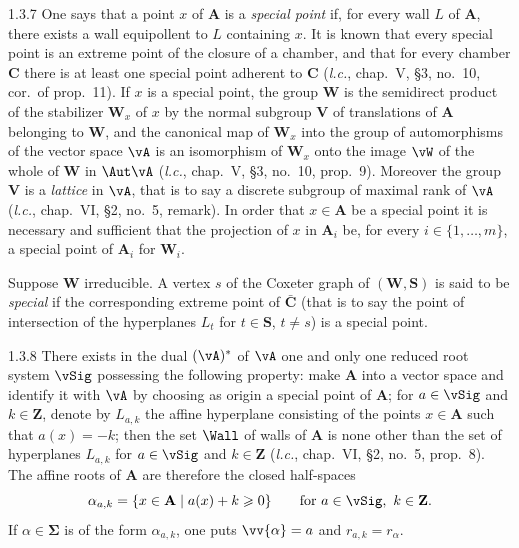 \documentclass[12pt,a4paper,oneside,english]{smfart}
\makeatletter
\newcommand{\btanchor}[1]{\leavevmode\Hy@raisedlink{\hypertarget{bt:#1}{}}}
\theoremstyle{definition}
\theoremstyle{bt}
\makeatother
\begin{document}
\num{1.3.7}\btanchor{1.3.7} One says that a point $x$ of $\mathbf{A}$ is a \emph{special
point} if, for every wall $L$ of $\mathbf{A}$, there exists a wall equipollent to $L$ containing $x$. It is known that every special point is an extreme point of the closure of a chamber, and that for every chamber $\mathbf{C}$ there is at least one special point adherent to $\mathbf{C}$ (\emph{l.c.}, chap.~V, \S3, no.~10, cor.\ of prop.~11). If $x$ is a special point, the group $\mathbf{W}$ is the semidirect product of the stabilizer $\mathbf{W}_x$ of $x$ by the normal subgroup $\mathbf{V}$ of translations of $\mathbf{A}$ belonging to $\mathbf{W}$, and the canonical map of $\mathbf{W}_x$ into the group of automorphisms of the vector space $\vA$ is an isomorphism of $\mathbf{W}_x$ onto the image $\vW$ of the whole of $\mathbf{W}$ in $\Aut\vA$ (\emph{l.c.}, chap.~V, \S3, no.~10, prop.~9). Moreover the group $\mathbf{V}$ is a
\emph{lattice} in $\vA$, that is to say a discrete subgroup of maximal rank of
$\vA$ (\emph{l.c.}, chap.~VI, \S2, no.~5, remark). In order that $x\in\mathbf{A}$ be a special point it is necessary and sufficient that the projection of $x$ in $\mathbf{A}_i$ be, for every $i\in\{1,\dots,m\}$, a special point of $\mathbf{A}_i$ for $\mathbf{W}_i$.

Suppose $\mathbf{W}$ irreducible. A vertex $s$ of the Coxeter graph of $(\mathbf{W},\mathbf{S})$ is said to be \emph{special} if the corresponding extreme point of $\bar{\mathbf{C}}$ (that is to say the point of intersection of the hyperplanes $L_t$ for $t\in\mathbf{S}$, $t\neq s$) is a special point.

\num{1.3.8}\btanchor{1.3.8} There exists in the dual $(\vA)^{*}$ of $\vA$ one and only one
reduced root system $\vSig$ possessing the following property: make $\mathbf{A}$ into a vector space and identify it with $\vA$ by choosing as origin a special point of $\mathbf{A}$; for $a\in\vSig$ and $k\in\mathbf{Z}$, denote by $L_{a,k}$ the affine hyperplane consisting of the points $x\in\mathbf{A}$ such that $a(x)=-k$; then the set $\Wall$ of walls of $\mathbf{A}$ is none other than the set of hyperplanes $L_{a,k}$ for $a\in\vSig$ and $k\in\mathbf{Z}$ (\emph{l.c.}, chap.~VI, \S2, no.~5, prop.~8). The affine roots of $\mathbf{A}$ are therefore the closed half-spaces
\[
  \alpha_{a,k}=\{x\in\mathbf{A}\mid a(x)+k\geqslant0\}
  \qquad\text{for } a\in\vSig,\ k\in\mathbf{Z}.
\]
If $\alpha\in\boldsymbol{\Sigma}$ is of the form $\alpha_{a,k}$, one puts $\vv{\alpha}=a$ and $r_{a,k}=r_\alpha$.
\end{document}
